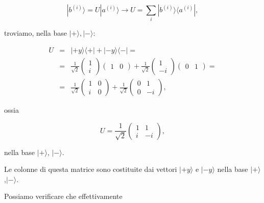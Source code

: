 \documentclass[a4paper,12pt,oneside]{book}
\begin{document}
\begin{equation}
| b^{(i)}\rangle =U| a^{(i)} \rangle \rightarrow U = \sum \limits_i | b^{(i)}\rangle \langle a^{(i)}| ,
\end{equation}

troviamo, nella base $| + \rangle,| - \rangle$:

\begin{eqnarray}
U &=& | +y \rangle \langle + | + |-y \rangle \langle - |=\nonumber \\
&=&\frac{1}{\sqrt{2}}
\begin{pmatrix}
1\\
i
\end{pmatrix}
\begin{pmatrix}
1 & 0
\end{pmatrix}+
\frac{1}{\sqrt{2}}
\begin{pmatrix}
1\\
-i
\end{pmatrix}
\begin{pmatrix}
0 & 1
\end{pmatrix}= \nonumber \\
&=&\frac{1}{\sqrt{2}}
\begin{pmatrix}
1 & 0\\
i & 0
\end{pmatrix}+
\frac{1}{\sqrt{2}}
\begin{pmatrix}
0 & 1\\
0 & -i
\end{pmatrix} ,
\end{eqnarray}

ossia

\begin{equation}
U= \frac{1}{\sqrt{2}}
\begin{pmatrix}
1 & 1\\
i & -i
\end{pmatrix} ,
\end{equation}

nella base $| + \rangle $, $| - \rangle $.

Le colonne di questa matrice sono costituite dai vettori $| +y \rangle $ e $| -y \rangle $ nella base $| + \rangle $,$| - \rangle $.

Possiamo verificare che effettivamente
\end{document}
